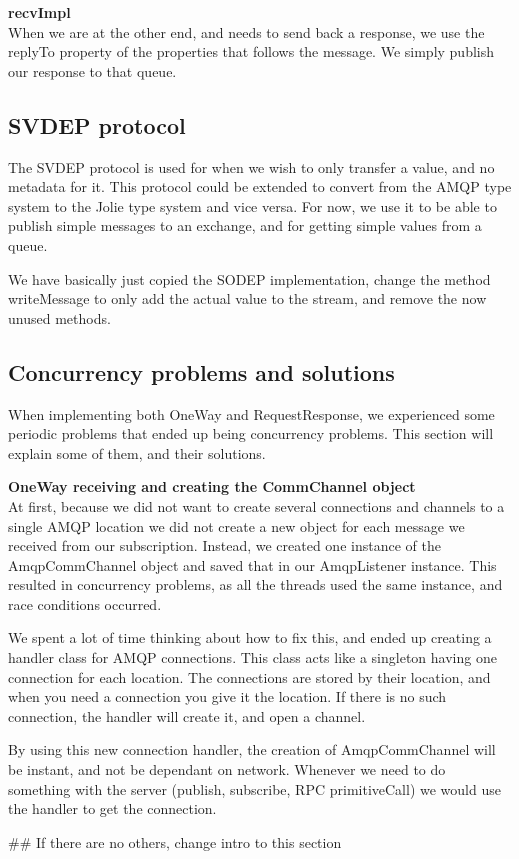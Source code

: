 \noindent\textbf{recvImpl}\\
When we are at the other end, and needs to send back a response, we use the replyTo property of the properties that follows the message. We simply publish our response to that queue.


\subsection{SVDEP protocol}
\label{subsec:SVDEP} %
The SVDEP protocol is used for when we wish to only transfer a value, and no metadata for it. This protocol could be extended to convert from the AMQP type system to the Jolie type system and vice versa. For now, we use it to be able to publish simple messages to an exchange, and for getting simple values from a queue.

We have basically just copied the SODEP implementation, change the method writeMessage to only add the actual value to the stream, and remove the now unused methods.

\subsection{Concurrency problems and solutions}
When implementing both OneWay and RequestResponse, we experienced some periodic problems that ended up being concurrency problems. This section will explain some of them, and their solutions.

\noindent\textbf{OneWay receiving and creating the CommChannel object}\\
At first, because we did not want to create several connections and channels to a single AMQP location we did not create a new object for each message we received from our subscription. Instead, we created one instance of the AmqpCommChannel object and saved that in our AmqpListener instance. This resulted in concurrency problems, as all the threads used the same instance, and race conditions occurred.

We spent a lot of time thinking about how to fix this, and ended up creating a handler class for AMQP connections. This class acts like a singleton having one connection for each location. The connections are stored by their location, and when you need a connection you give it the location. If there is no such connection, the handler will create it, and open a channel.

By using this new connection handler, the creation of AmqpCommChannel will be instant, and not be dependant on network. Whenever we need to do something with the server (publish, subscribe, RPC primitiveCall) we would use the handler to get the connection.

\#\# If there are no others, change intro to this section
\newpage

